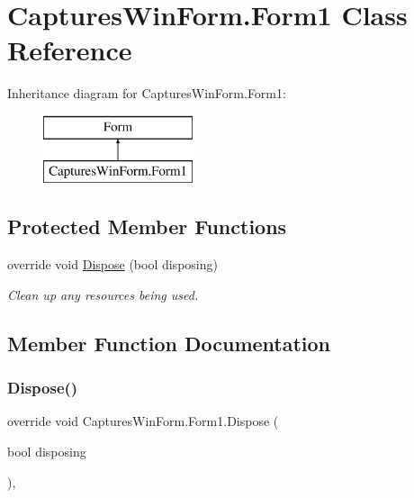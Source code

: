 \hypertarget{class_captures_win_form_1_1_form1}{}\section{Captures\+Win\+Form.\+Form1 Class Reference}
\label{class_captures_win_form_1_1_form1}
Inheritance diagram for Captures\+Win\+Form.\+Form1\+:\begin{figure}[H]
\begin{center}
\leavevmode
\includegraphics[height=2.000000cm]{class_captures_win_form_1_1_form1}
\end{center}
\end{figure}
\subsection*{Protected Member Functions}
\begin{DoxyCompactItemize}
\item 
override void \hyperlink{class_captures_win_form_1_1_form1_a1e8c2046bd833e426fe6213ffda1b37c}{Dispose} (bool disposing)
\begin{DoxyCompactList}\small\item\em Clean up any resources being used. \end{DoxyCompactList}\end{DoxyCompactItemize}


\subsection{Member Function Documentation}
\mbox{\label{class_captures_win_form_1_1_form1_a1e8c2046bd833e426fe6213ffda1b37c}} 
\subsubsection{\texorpdfstring{Dispose()}{Dispose()}}
{\footnotesize\ttfamily override void Captures\+Win\+Form.\+Form1.\+Dispose (\begin{DoxyParamCaption}\item[{bool}]{disposing }\end{DoxyParamCaption})\hspace{0.3cm}{\ttfamily [inline]}, {\ttfamily [protected]}}



